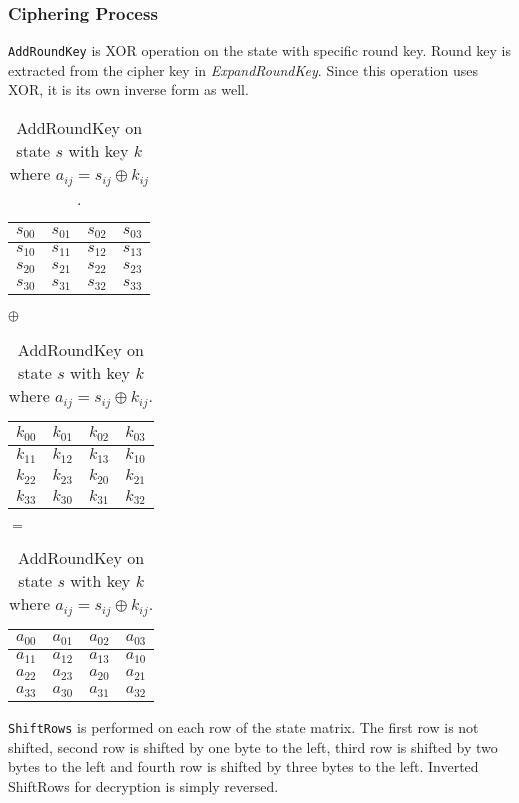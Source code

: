 \subsubsection*{Ciphering Process}
\texttt{AddRoundKey} is XOR operation on the state with specific round key. 
Round key is extracted from the cipher key in \textit{ExpandRoundKey}. Since
this operation uses XOR, it is its own inverse form as well.

\begin{table}[H]
\label{shift}
\begin{center}
\begin{tabular}{|c|c|c|c|}\hline%
 $s_{00}$ & $s_{01}$ & $s_{02}$ & $s_{03}$  \\\hline
 $s_{10}$ & $s_{11}$ & $s_{12}$ & $s_{13}$  \\\hline
 $s_{20}$ & $s_{21}$ & $s_{22}$ & $s_{23}$  \\\hline
 $s_{30}$ & $s_{31}$ & $s_{32}$ & $s_{33}$  \\\hline
\end{tabular}
$\oplus$
\begin{tabular}{|c|c|c|c|}\hline%
 $k_{00}$ & $k_{01}$ & $k_{02}$ & $k_{03}$  \\\hline
 $k_{11}$ & $k_{12}$ & $k_{13}$ & $k_{10}$  \\\hline
 $k_{22}$ & $k_{23}$ & $k_{20}$ & $k_{21}$  \\\hline
 $k_{33}$ & $k_{30}$ & $k_{31}$ & $k_{32}$  \\\hline
\end{tabular}
$=$
\begin{tabular}{|c|c|c|c|}\hline%
 $a_{00}$ & $a_{01}$ & $a_{02}$ & $a_{03}$  \\\hline
 $a_{11}$ & $a_{12}$ & $a_{13}$ & $a_{10}$  \\\hline
 $a_{22}$ & $a_{23}$ & $a_{20}$ & $a_{21}$  \\\hline
 $a_{33}$ & $a_{30}$ & $a_{31}$ & $a_{32}$  \\\hline
\end{tabular}
\end{center}
\caption{AddRoundKey on state $s$ with key $k$ where $a_{ij} = s_{ij}\oplus k_{ij}$.}
\end{table}



\hspace{-1.5em}\texttt{ShiftRows} is performed on each row of the state matrix.
The first row is not shifted, second row is shifted by one byte to the left, 
third row is shifted by two bytes to the left and fourth row is shifted by three
bytes to the left. Inverted ShiftRows for decryption is simply reversed.

